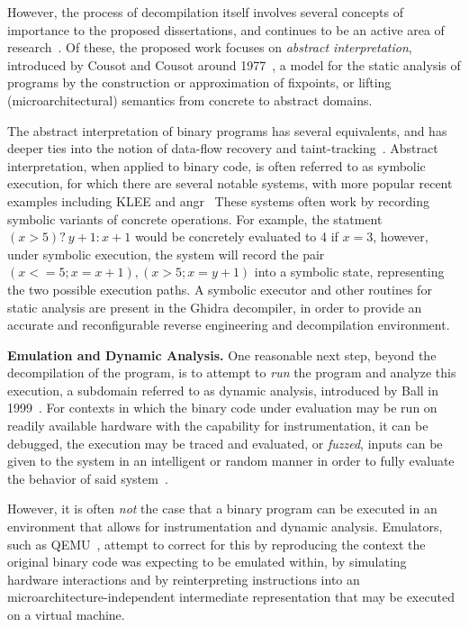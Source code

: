 However, the process of decompilation itself involves several concepts of importance to the proposed dissertations, and continues to be an active area of research~\cite{chen2019survey}.
Of these, the proposed work focuses on \emph{abstract interpretation}, introduced by Cousot and Cousot around 1977~\cite{cousot1977abstract}, a model for the static analysis of programs by the construction or approximation of fixpoints, or lifting (microarchitectural) semantics from concrete to abstract domains.

The abstract interpretation of binary programs has several equivalents, and has deeper ties into the notion of data-flow recovery and taint-tracking~\cite{schwartz2010all}.
Abstract interpretation, when applied to binary code, is often referred to as symbolic execution, for which there are several notable systems, with more popular recent examples including KLEE and angr~\cite{cadar2008klee,wang2017angr}
These systems often work by recording symbolic variants of concrete operations.
For example, the statment $(x > 5) ?\ y + 1 : x + 1$ would be concretely evaluated to 4 if $x = 3$, however, under symbolic execution, the system will record the pair $(x<=5; x=x+1),(x>5;x=y+1)$ into a symbolic state, representing the two possible execution paths.
A symbolic executor and other routines for static analysis are present in the Ghidra decompiler, in order to provide an accurate and reconfigurable reverse engineering and decompilation environment.

\textbf{Emulation and Dynamic Analysis.} One reasonable next step, beyond the decompilation of the program, is to attempt to \emph{run} the program and analyze this execution, a subdomain referred to as dynamic analysis, introduced by Ball in 1999~\cite{ball1999concept}.
For contexts in which the binary code under evaluation may be run on readily available hardware with the capability for instrumentation, it can be debugged, the execution may be traced and evaluated, or \emph{fuzzed}, inputs can be given to the system in an intelligent or random manner in order to fully evaluate the behavior of said system~\cite{li2018fuzzing}.

However, it is often \emph{not} the case that a binary program can be executed in an environment that allows for instrumentation and dynamic analysis.
Emulators, such as QEMU~\cite{bellard2005qemu}, attempt to correct for this by reproducing the context the original binary code was expecting to be emulated within, by simulating hardware interactions and by reinterpreting instructions into an microarchitecture-independent intermediate representation that may be executed on a virtual machine.

